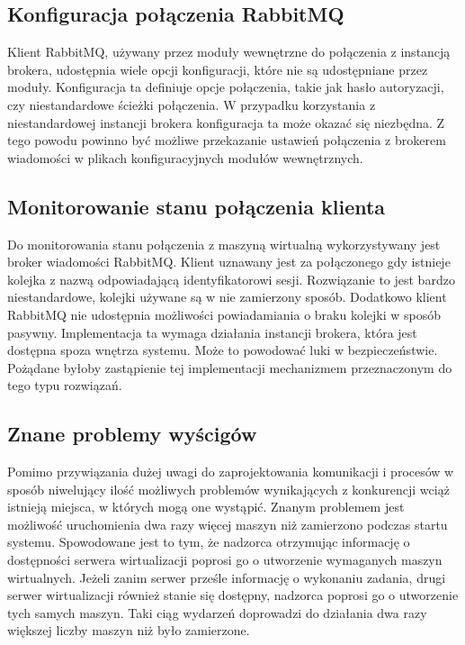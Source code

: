 \documentclass[../podsumowanie.tex]{subfiles}
\begin{document}
\subsection{Konfiguracja połączenia RabbitMQ}

Klient RabbitMQ, używany przez moduły wewnętrzne do połączenia z instancją brokera, udostępnia wiele opcji konfiguracji, które nie są udostępniane przez moduły. Konfiguracja ta definiuje opcje połączenia, takie jak hasło autoryzacji, czy niestandardowe ścieżki połączenia. W przypadku korzystania z niestandardowej instancji brokera konfiguracja ta może okazać się niezbędna. Z tego powodu powinno być możliwe przekazanie ustawień połączenia z brokerem wiadomości w plikach konfiguracyjnych modułów wewnętrznych.

\subsection{Monitorowanie stanu połączenia klienta}

Do monitorowania stanu połączenia z maszyną wirtualną wykorzystywany jest broker wiadomości RabbitMQ. Klient uznawany jest za połączonego gdy istnieje kolejka z nazwą odpowiadającą identyfikatorowi sesji. Rozwiązanie to jest bardzo niestandardowe, kolejki używane są w nie zamierzony sposób. Dodatkowo klient RabbitMQ nie udostępnia możliwości powiadamiania o braku kolejki w sposób pasywny. Implementacja ta wymaga działania instancji brokera, która jest dostępna spoza wnętrza systemu. Może to powodować luki w bezpieczeństwie. Pożądane byłoby zastąpienie tej implementacji mechanizmem przeznaczonym do tego typu rozwiązań.

\subsection{Znane problemy wyścigów}

Pomimo przywiązania dużej uwagi do zaprojektowania komunikacji i procesów w sposób niwelujący ilość możliwych problemów wynikających z konkurencji wciąż istnieją miejsca, w których mogą one wystąpić. Znanym problemem jest możliwość uruchomienia dwa razy więcej maszyn niż zamierzono podczas startu systemu. Spowodowane jest to tym, że nadzorca otrzymując informację o dostępności serwera wirtualizacji poprosi go o utworzenie wymaganych maszyn wirtualnych. Jeżeli zanim serwer prześle informację o wykonaniu zadania, drugi serwer wirtualizacji również stanie się dostępny, nadzorca poprosi go o utworzenie tych samych maszyn. Taki ciąg wydarzeń doprowadzi do działania dwa razy większej liczby maszyn niż było zamierzone.
\end{document}
